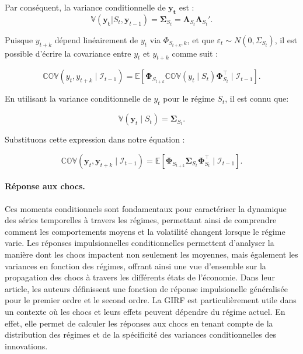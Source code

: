 \begin{sloppypar}
Par conséquent, la variance conditionnelle de $\bm{y_t}$ est :
\begin{equation}
    \mathbb{V}(\bm{y_t} | S_t, \bm{y}_{t-1}) = \bm{\Sigma}_{S_t} = \bm{\Lambda}_{S_t} \bm{\Lambda}_{S_t}'.
\end{equation}

Puisque \( y_{t+k} \) dépend linéairement de \( y_t \) via \( \Phi_{S_{t+k},k} \), et que \( \varepsilon_t \sim N(0, \Sigma_{S_t}) \), il est possible d'écrire la covariance entre \( y_t \) et \( y_{t+k} \) comme suit :

\begin{equation}
  \mathbb{COV}(y_t, y_{t+k} \mid \mathcal{I}_{t-1}) = \mathbb{E} \left[ \bm{\Phi}_{S_{t+k}} \mathbb{COV}(y_t \mid S_t) \bm{\Phi}_{S_t}^\top \mid \mathcal{I}_{t-1} \right].  
\end{equation}

En utilisant la variance conditionnelle de \( y_t \) pour le régime \( S_t \), il est connu que:

\begin{equation}
  \mathbb{V}(\bm{y}_t \mid S_t) =  \bm{\Sigma}_{S_t}.  
\end{equation}

Substituons cette expression dans notre équation :

\begin{equation}
    \mathbb{COV}(\bm{y}_t, \bm{y}_{t+k} \mid \mathcal{I}_{t-1}) = \mathbb{E} \left[ \bm{\Phi}_{S_{t+k}} \bm{\Sigma}_{S_t} \bm{\Phi}_{S_t}^\top \mid \mathcal{I}_{t-1} \right].
\end{equation}

\paragraph{Réponse aux chocs.} Ces moments conditionnels sont fondamentaux pour caractériser la dynamique des séries temporelles à travers les régimes, permettant ainsi de comprendre comment les comportements moyens et la volatilité changent lorsque le régime varie. Les réponses impulsionnelles conditionnelles permettent d'analyser la manière dont les chocs impactent non seulement les moyennes, mais également les variances en fonction des régimes, offrant ainsi une vue d'ensemble sur la propagation des chocs à travers les différents états de l'économie. Dans leur article, les auteurs définissent une fonction de réponse impulsionelle généralisée pour le premier ordre et le second ordre. La GIRF est particulièrement utile dans un contexte où les chocs et leurs effets peuvent dépendre du régime actuel. En effet, elle permet de calculer les réponses aux chocs en tenant compte de la distribution des régimes et de la spécificité des variances conditionnelles des innovations.


\end{sloppypar}
